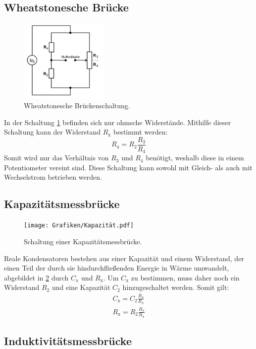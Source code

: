 \subsection{Wheatstonesche Brücke}

\begin{figure}[h]
  \centering
  \includegraphics[height=4cm]{Grafiken/Wheatstone.pdf}
  \caption{Wheatstonesche Brückenschaltung. \cite{1}}
  \label{fig:Wheatstone}
\end{figure}
In der Schaltung \ref{fig:Wheatstone} befinden sich nur ohmsche Widerstände. Mithilfe dieser Schaltung kann der Widerstand $R_\text{x}$ bestimmt werden:
\begin{equation}
	R_\text{x} = R_2\frac{R_3}{R_4}
\end{equation}
Somit wird nur das Verhältnis von $R_3$ und $R_4$ benötigt, weshalb diese in einem Potentiometer vereint sind.
Diese Schaltung kann sowohl mit Gleich- als auch mit Wechselstrom betrieben werden.

\subsection{Kapazitätsmessbrücke}

\begin{figure}[h]
  \centering
  \texttt{[image: Grafiken/Kapazität.pdf]}
  \caption{Schaltung einer Kapazitätsmessbrücke. \cite{1}}
  \label{fig:Kapazität}
\end{figure}
Reale Kondensatoren bestehen aus einer Kapazität und einem Widerstand, der einen Teil der durch sie hindurchfließenden Energie in Wärme umwandelt, abgebildet in \ref{fig:Kapazität} durch $C_x$ und $R_\text{x}$. Um $C_\text{x}$ zu bestimmen, muss daher noch ein Widerstand $R_2$ und eine Kapazität $C_2$ hinzugeschaltet werden. 
Somit gilt: 
\begin{gather}
	C_\text{x} = C_2\frac{R_4}{R_3} \\
	R_\text{x} = R_2\frac{R_3}{R_4}
\end{gather}

\subsection{Induktivitätsmessbrücke}

